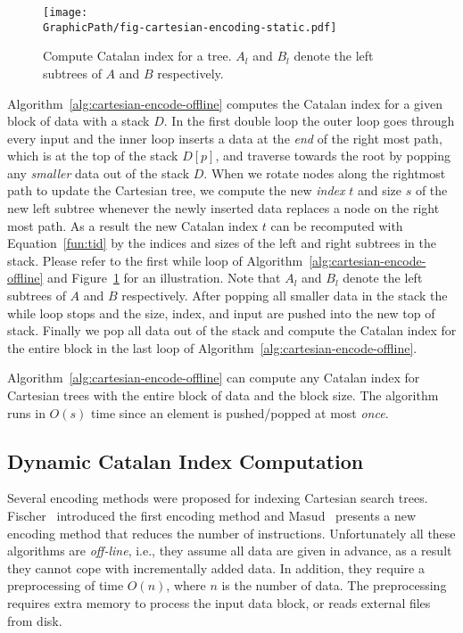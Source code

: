 

\begin{figure}[!thb]
  \centering
  \texttt{[image: \\GraphicPath/fig-cartesian-encoding-static.pdf]}
  \caption{Compute Catalan index for a tree.  $A_l$ and $B_l$ denote
    the left subtrees of $A$ and $B$ respectively.}
  \label{fig:fig-cartesian-encoding-static}
\end{figure}

Algorithm~\ref{alg:cartesian-encode-offline} computes the Catalan
index for a given block of data with a stack $D$.  In the first double
loop the outer loop goes through every input and the inner loop
inserts a data at the {\em end} of the right most path, which is at
the top of the stack $D[p]$, and traverse towards the root by popping
any {\em smaller} data out of the stack $D$.  When we rotate nodes
along the rightmost path to update the Cartesian tree, we compute the
new {\em index} $t$ and size $s$ of the new left subtree whenever the
newly inserted data replaces a node on the right most path.  As a
result the new Catalan index $t$ can be recomputed with
Equation~\ref{fun:tid} by the indices and sizes of the left and right
subtrees in the stack.  Please refer to the first while loop of
Algorithm~\ref{alg:cartesian-encode-offline} and
Figure~\ref{fig:fig-cartesian-encoding-static} for an illustration.
Note that $A_l$ and $B_l$ denote the left subtrees of $A$ and $B$
respectively.  After popping all smaller data in the stack the while
loop stops and the size, index, and input are pushed into the new top
of stack.  Finally we pop all data out of the stack and compute the
Catalan index for the entire block in the last loop of
Algorithm~\ref{alg:cartesian-encode-offline}.

Algorithm~\ref{alg:cartesian-encode-offline} can compute any Catalan
index for Cartesian trees with the entire block of data and the block
size.  The algorithm runs in $O(s)$ time since an element is
pushed/popped at most {\em once}.



\subsection{Dynamic Catalan Index Computation}

Several encoding methods were proposed for indexing Cartesian search
trees.  Fischer~\cite{Fischer2006TheoreticalAP} introduced the first
encoding method and Masud~\cite{Hasan2010CacheOA} presents a new
encoding method that reduces the number of instructions.
Unfortunately all these algorithms are {\em off-line}, i.e., they
assume all data are given in advance, as a result they cannot cope
with incrementally added data.  In addition, they require a
preprocessing of time $O(n)$, where $n$ is the number of data.  The
preprocessing requires extra memory to process the input data block,
or reads external files from disk.

